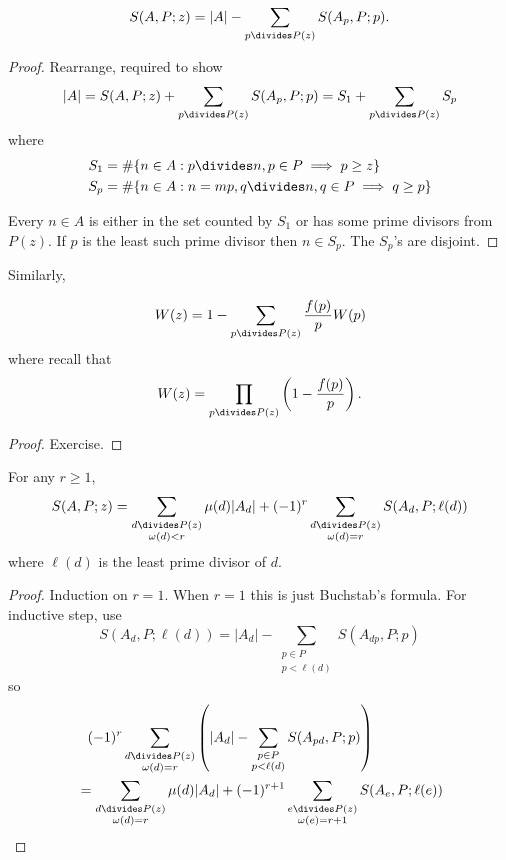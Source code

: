 \documentclass[a4paper]{article}
\begin{document}
\begin{lemma}
  \[
    S(A, P; z) = |A| - \sum_{p \divides P(z)} S(A_p, P; p).
  \]
\end{lemma}

\begin{proof}
  Rearrange, required to show
  \[
    |A|
    = S(A, P; z) + \sum_{p \divides P(z)} S(A_p, P; p)
    = S_1 + \sum_{p \divides P(z)} S_p
  \]
  where
  \begin{align*}
    S_1 &= \#\{n \in A: p \divides n, p \in P \implies p \geq z\} \\
    S_p &= \#\{n \in A: n = mp, q \divides n, q \in P \implies q \geq p\}
  \end{align*}

  Every \(n \in A\) is either in the set counted by \(S_1\) or has some prime divisors from \(P(z)\). If \(p\) is the least such prime divisor then \(n \in S_p\). The \(S_p\)'s are disjoint.
\end{proof}

Similarly,

\begin{lemma}
 \[
   W(z) = 1 - \sum_{p \divides P(z)} \frac{f(p)}{p} W(p)
 \]
 where recall that
 \[
   W(z) = \prod_{p \divides P(z)} \left( 1 - \frac{f(p)}{p} \right).
 \]
\end{lemma}

\begin{proof}
  Exercise.
\end{proof}

\begin{corollary}
  For any \(r \geq 1\),
  \[
    S(A, P; z) = \sum_{\substack{d \divides P(z) \\ \omega(d) < r}} \mu(d) |A_d| + (-1)^r \sum_{\substack{d \divides P(z) \\ \omega(d) = r}} S(A_d, P; \ell(d))
  \]
  where \(\ell(d)\) is the least prime divisor of \(d\).
\end{corollary}

\begin{proof}
  Induction on \(r = 1\). When \(r = 1\) this is just Buchstab's formula. For inductive step, use
  \[
    S(A_d, P; \ell(d))
    = |A_d| - \sum_{\substack{p \in P \\ p < \ell(d)}} S(A_{dp}, P; p)
  \]
  so
  \begin{align*}
    &\phantom{= } (-1)^r \sum_{\substack{d \divides P(z) \\\omega(d) = r}} \left( |A_d| - \sum_{\substack{p \in P \\ p < \ell(d)}} S(A_{pd}, P; p) \right) \\
    &= \sum_{\substack{d \divides P(z) \\ \omega(d) = r}} \mu(d) |A_d| + (-1)^{r + 1} \sum_{\substack{e \divides P(z) \\ \omega(e) = r + 1}} S(A_e, P; \ell(e))
  \end{align*}
\end{proof}
\end{document}
